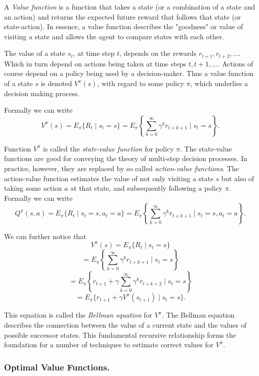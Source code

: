 A \textit{Value function} is a function that takes a state (or a combination of a state and an action) and returns the expected future reward that follows that state (or state-action). In essence, a value function describes the "goodness" or value of visiting a state and allows the agent to compare states with each other.

The value of a state $s_{t}$, at time step $t$, depends on the rewards $ r_{t+1},r_{t+2},... $. Which in turn depend on actions being taken at time steps $ t, t+1,... $. Actions of course depend on a policy being used by a decision-maker. Thus a value function of a state $s$ is denoted $V^{\pi}(s)$, with regard to some policy $\pi$, which underlies a decision making process.

Formally we can write
$$ V^{\pi}(s)=E_{\pi}\{R_{t}\;|\;s_{t}=s\} = E_{\pi}\left\{\displaystyle\sum_{k=0}^{\infty}\gamma^{k}r_{t+k+1}\;|\;s_{t}=s\right\}. $$

Function $V^{\pi}$ is called the \textit{state-value function} for policy $\pi$. The state-value functions are good for conveying the theory of multi-step decision processes. In practice, however, they are replaced by so called \textit{action-value functions}. The action-value function estimates the value of not only visiting a state $s$ but also of taking some action $a$ at that state, and subsequently following a policy $ \pi $. Formally we can write
$$ Q^{\pi}(s,a)=E_{\pi}\{R_{t}\;|\;s_{t}=s,a_{t}=a\} = E_{\pi}\left\{\displaystyle\sum_{k=0}^{\infty}\gamma^{k}r_{t+k+1}\;|\;s_{t}=s,a_{t}=a\right\}. $$

We can further notice that
$$ V^{\pi}(s)=E_{\pi}\{R_{t}\;|\;s_{t}=s\} $$
$$ =E_{\pi}\left\{\displaystyle\sum_{k=0}^{\infty}\gamma^{k}r_{t+k+1}\;|\;s_{t}=s\right\} $$
$$ =E_{\pi}\left\{r_{t+1}+\gamma\displaystyle\sum_{k=0}^{\infty}\gamma^{k}r_{t+k+2}\;|\;s_{t}=s\right\} $$
$$ =E_{\pi}\{r_{t+1} + \gamma V^{\pi}(s_{t+1})\;|\;s_{t}=s\}. $$

This equation is called the \textit{Bellman equation} for $ V^{\pi} $. The Bellman equation describes the connection between the value of a current state and the values of possible successor states. This fundamental recursive  relationship forms the foundation for a number of techniques to estimate correct values for $V^{\pi}$.

\subsubsection{Optimal Value Functions.}

